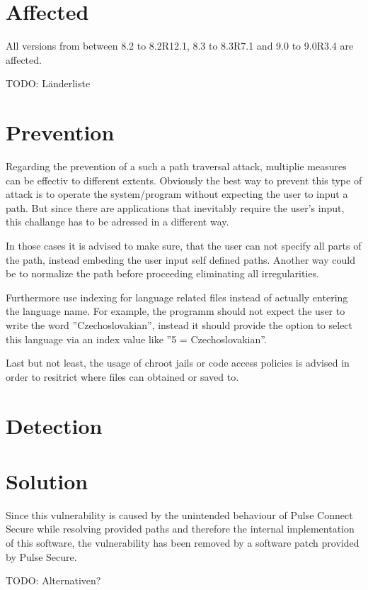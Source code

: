 \section{Affected}
\label{affected}
All versions from between 8.2 to 8.2R12.1, 8.3 to 8.3R7.1 and 9.0 to 9.0R3.4 are affected.\autocite{NVDCVE:online}

TODO: Länderliste

\section{Prevention}
\label{prevention}
Regarding the prevention of a such a path traversal attack, multiplie measures can be effectiv to different extents. Obviously the best way to prevent this type of attack is to operate the system/program without expecting the user to input a path. But since there are applications that inevitably require the user's input, this challange has to be adressed in a different way.\autocite{OWASP-PathTraversal:online}

In those cases it is advised to make sure, that the user can not specify all parts of the path, instead embeding the user input self defined paths. Another way could be to normalize the path before proceeding eliminating all irregularities.\autocite{OWASP-PathTraversal:online}

Furthermore use indexing for language related files instead of actually entering the language name. For example, the programm should not expect the user to write the word ''Czechoslovakian'', instead it should provide the option to select this language via an index value like ''5 = Czechoslovakian''.\autocite{OWASP-PathTraversal:online}

Last but not least, the usage of chroot jails or code access policies is advised in order to resitrict where files can obtained or saved to.\autocite{OWASP-PathTraversal:online}

\section{Detection}
\label{detection}

\section{Solution}
\label{solution}
Since this vulnerability is caused by the unintended behaviour of Pulse Connect Secure while resolving provided paths and therefore the internal implementation of this software, the vulnerability has been removed by a software patch provided by Pulse Secure.

TODO: Alternativen?